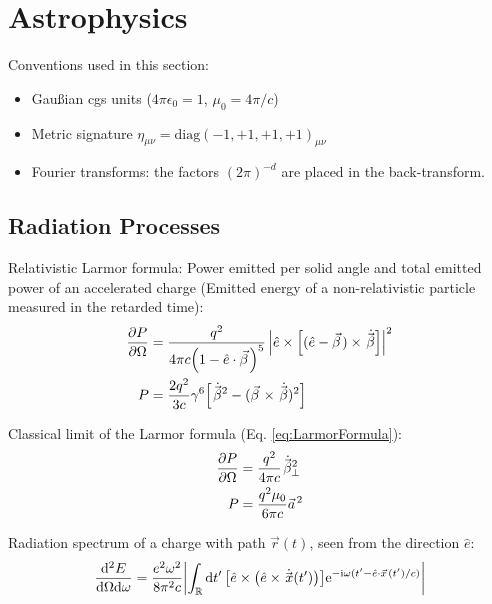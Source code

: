 \section{Astrophysics}
	Conventions used in this section:
	\begin{itemize}
		\item Gaußian cgs units ($4\pi\epsilon_0 = 1$, $\mu_0 = 4 \pi / c$)
		\item Metric signature $\eta_{\mu\nu}=\mathrm{diag}(-1,+1,+1,+1)_{\mu\nu}$
		\item Fourier transforms: the factors $(2\pi)^{-d}$ are placed in the back-transform.
	\end{itemize}
	\subsection{Radiation Processes}

		\noindent
		Relativistic Larmor formula:
		Power emitted per solid angle and total emitted power of an accelerated charge (Emitted energy of a non-relativistic particle measured in the retarded time):
		\begin{equation}
			\label{eq:LarmorFormula}
			\begin{aligned}
				\pdv{P}{\Omega} &= \frac{q^2}{4\pi c\qty(1-\hat{e}\cdot\vec{\beta})^5} \left| \hat{e}\times\qty[(\hat{e}-\vec{\beta}) \times \dot{\vec{\beta}}] \right|^2 \\
				P &= \frac{2q^2}{3c}\gamma^6\qty[\dot{\vec{\beta}}^2 - (\vec{\beta}\times\dot{\vec{\beta}})^2] \\
			\end{aligned}
		\end{equation}

		\noindent
		Classical limit of the Larmor formula (Eq. \ref{eq:LarmorFormula}):
		\begin{equation}
			\begin{aligned}
				\pdv{P}{\Omega} &= \frac{q^2}{4\pi c}\dot{\vec{\beta}}_\perp^2 \\
				P &= \frac{q^2 \mu_0}{6\pi c}\vec{a}^2\\
			\end{aligned}
		\end{equation}

		\noindent
		Radiation spectrum of a charge with path $\vec{r}(t)$, seen from the direction $\hat{e}$:
		\begin{equation}
			\frac{\dd^2 E}{\dd \Omega \dd \omega} = \frac{e^2 \omega^2}{8 \pi^2 c} \abs{\int_{\mathbb{R}}\dd t'\, \qty[\hat{e}\times \qty(\hat{e}\times \dot{\vec{x}}(t'))] \ex^{-\i \omega (t'-\hat{e}\cdot \vec{x}(t')/c)}}
		\end{equation}

